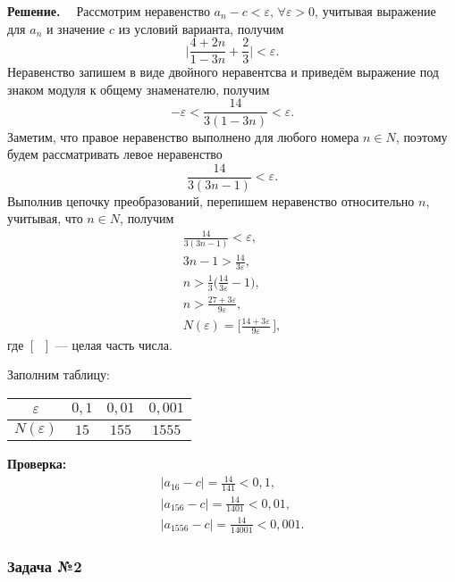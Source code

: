 \documentclass[12pt]{article}
\begin{document}
	{ \bf Решение. ~}	
	Рассмотрим неравенство $ a_n-c < \varepsilon , \, \forall \varepsilon > 0 $, учитывая выражение для $ a_n $ и значение $ c $ из условий варианта,
	получим
	$$
	\biggl | \frac {4 + 2 n}{1 - 3 n} + \frac {2}{3} \biggr | < \varepsilon .
	$$
	Неравенство запишем в виде двойного неравентсва и приведём выражение под знаком модуля к общему знаменателю,
	получим
	$$
	- \varepsilon < \frac{14}{3 (1 - 3 n)} < \varepsilon .
	$$
	Заметим, что правое неравенство выполнено для любого номера $ n \in  N $, поэтому будем рассматривать левое неравенство
	$$
	\frac {14}{3 (3 n - 1)} < \varepsilon .
	$$
	Выполнив цепочку преобразований, перепишем неравенство относительно $ n $, учитывая, что $ n \in N $, получим
	$$
	\begin{array}{c}
	\frac {14}{3 (3 n - 1)} < \varepsilon , 							 \\ [ 8 pt]
	3 n - 1 > \frac {14}{3 \varepsilon }, 							 \\ [ 8 pt]
	n > \frac {1}{3} \biggl ( \frac {14}{3 \varepsilon } - 1 \biggr ), 	 \\ [ 8 pt]
	n> \frac {27 + 3 \varepsilon } {9 \varepsilon }, 		 \\ [ 8 pt]
	N ( \varepsilon ) = \Biggl [ \frac {14 + 3 \varepsilon }{9 \varepsilon } \, \Biggr ],
	\end{array}
	$$
	где $ [ \phantom{a}] $ --- целая часть числа.
	
	\newpage
	Заполним таблицу:
	
	\begin{table}[h!]
	\begin{center}
		\begin{tabular}{| c | c | c | c |}
		\hline
		$ \varepsilon $ & $ 0 {,} 1 $ & $ 0 {,} 01 $ & $ 0 {,} 001 $ \\  \hline
		$ N ( \varepsilon ) $ & $ 15 $ & $ 155 $ & $ 1555 $ \\
		\hline		
		\end{tabular}	
	\end{center}
	\end{table}

	\textbf{Проверка:}
	$$
	\begin{array} {l}
	| a_{16} - c | = \frac {14} {141} < 0 {,} 1 ,	 \\ [ 10 pt]
	| a_{156} - c | = \frac {14} {1401} < 0 {,} 01 , \\ [ 10 pt]
	| a_{1556} - c | = \frac {14} {14001} < 0 {,} 001 .
	\end{array}
	$$
	
	\subsubsection*{\center Задача №2}
	
\end{document}
